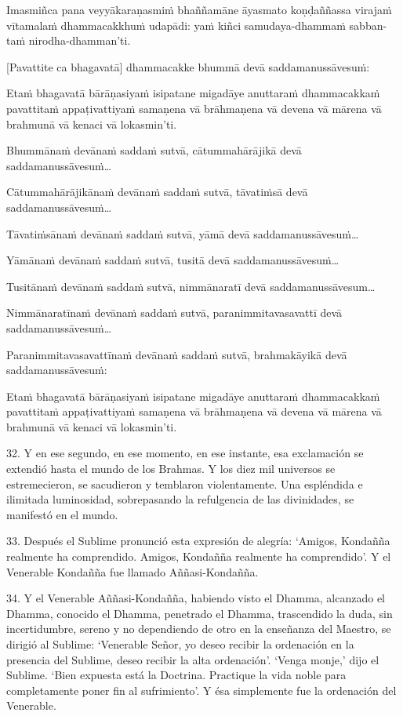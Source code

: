 Imasmiñca pana veyyākaraṇasmiṁ bhaññamāne āyasmato koṇḍaññassa virajaṁ
vītamalaṁ dhammacakkhuṁ udapādi: yaṁ kiñci samudaya-dhammaṁ sabban-taṁ
nirodha-dhamman'ti.

[Pavattite ca bhagavatā] dhammacakke bhummā devā saddamanussāvesuṁ:

Etaṁ bhagavatā bārāṇasiyaṁ isipatane migadāye anuttaraṁ dhammacakkaṁ
pavattitaṁ appaṭivattiyaṁ samaṇena vā brāhmaṇena vā devena vā mārena vā
brahmunā vā kenaci vā lokasmin'ti.

Bhummānaṁ devānaṁ saddaṁ sutvā, cātummahārājikā devā
saddamanussāvesuṁ\ldots

Cātummahārājikānaṁ devānaṁ saddaṁ sutvā, tāvatiṁsā devā
saddamanussāvesuṁ\ldots

Tāvatiṁsānaṁ devānaṁ saddaṁ sutvā, yāmā devā saddamanussāvesuṁ\ldots

Yāmānaṁ devānaṁ saddaṁ sutvā, tusitā devā saddamanussāvesuṁ\ldots

Tusitānaṁ devānaṁ saddaṁ sutvā, nimmānaratī devā saddamanussāvesum\ldots

Nimmānaratīnaṁ devānaṁ saddaṁ sutvā, paranimmitavasavattī devā
saddamanussāvesuṁ\ldots

Paranimmitavasavattīnaṁ devānaṁ saddaṁ sutvā, brahmakāyikā devā
saddamanussāvesuṁ:

Etaṁ bhagavatā bārāṇasiyaṁ isipatane migadāye anuttaraṁ dhammacakkaṁ
pavattitaṁ appaṭivattiyaṁ samaṇena vā brāhmaṇena vā devena vā mārena vā
brahmunā vā kenaci vā lokasmin'ti.

\clearpage

\englishText
\markboth{\englishTitle}{\rightmark}

32. Y en ese segundo, en ese momento, en ese instante, esa exclamación se extendió hasta el mundo de los Brahmas. Y los diez mil universos se estremecieron, se sacudieron y temblaron violentamente. Una espléndida e ilimitada luminosidad, sobrepasando la refulgencia de las divinidades, se manifestó en el mundo.

33. Después el Sublime pronunció esta expresión de alegría: ‘Amigos, Kondañña realmente ha comprendido. Amigos, Kondañña realmente ha comprendido’. Y el Venerable Kondañña fue llamado Aññasi-Kondañña.

34. Y el Venerable Aññasi-Kondañña, habiendo visto el Dhamma, alcanzado el Dhamma, conocido el Dhamma, penetrado el Dhamma, trascendido la duda, sin incertidumbre, sereno y no dependiendo de otro en la enseñanza del Maestro, se dirigió al Sublime: ‘Venerable Señor, yo deseo recibir la ordenación en la presencia del Sublime, deseo recibir la alta ordenación’. ‘Venga monje,’ dijo el Sublime. ‘Bien expuesta está la Doctrina. Practique la vida noble para completamente poner fin al sufrimiento’. Y ésa simplemente fue la ordenación del Venerable.




